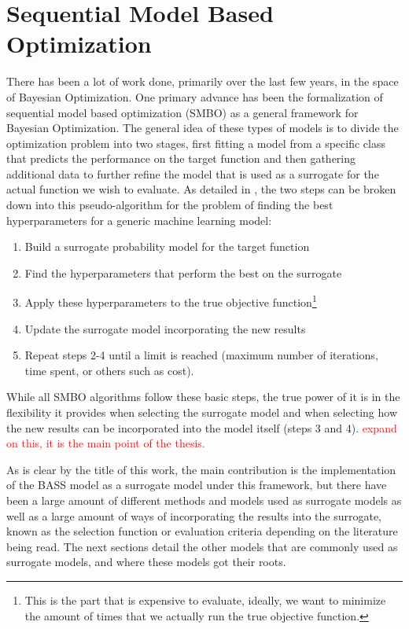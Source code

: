 \chapter{Sequential Model Based Optimization}

There has been a lot of work done, primarily over the last few years, in the space of Bayesian Optimization. One primary advance has been the formalization of sequential model based optimization (SMBO) as a general framework for Bayesian Optimization. The general idea of these types of models is to divide the optimization problem into two stages, first fitting a model from a specific class that predicts the performance on the target function and then gathering additional data to further refine the model that is used as a surrogate for the actual function we wish to evaluate. As detailed in \cite{conceptualBO}, the two steps can be broken down into this pseudo-algorithm for the problem of finding the best hyperparameters for a generic machine learning model: 

\begin{enumerate}
	\item Build a surrogate probability model for the target function
	\item Find the hyperparameters that perform the best on the surrogate
	\item Apply these hyperparameters to the true objective function\footnote{This is the part that is expensive to evaluate, ideally, we want to minimize the amount of times that we actually run the true objective function.}
	\item Update the surrogate model incorporating the new results
	\item Repeat steps 2-4 until a limit is reached (maximum number of iterations, time spent, or others such as cost).
\end{enumerate}

While all SMBO algorithms follow these basic steps, the true power of it is in the flexibility it provides when selecting the surrogate model and when selecting how the new results can be incorporated into the model itself (steps 3 and 4). \textcolor{red}{expand on this, it is the main point of the thesis.} 

As is clear by the title of this work, the main contribution is the implementation of the BASS model as a surrogate model under this framework, but there have been a large amount of different methods and models used as surrogate models as well as a large amount of ways of incorporating the results into the surrogate, known as the selection function or evaluation criteria depending on the literature being read. The next sections detail the other models that are commonly used as surrogate models, and where these models got their roots.


